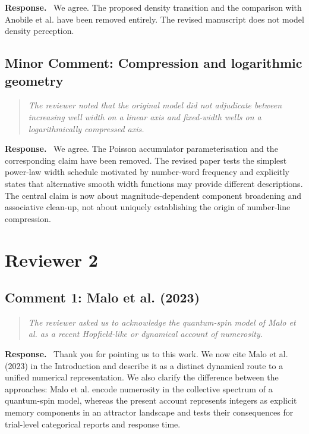 \documentclass[11pt]{article}
\newenvironment{reviewercomment}{\begin{quote}\color{reviewgray}\itshape}{\end{quote}}
\newenvironment{authorresponse}{\par\noindent\textbf{\color{responseblue}Response.}\ }{\par}
\begin{document}
\begin{authorresponse}
We agree. The proposed density transition and the comparison with Anobile et al. have been removed entirely. The revised manuscript does not model density perception.
\end{authorresponse}

\subsection*{Minor Comment: Compression and logarithmic geometry}

\begin{reviewercomment}
The reviewer noted that the original model did not adjudicate between increasing well width on a linear axis and fixed-width wells on a logarithmically compressed axis.
\end{reviewercomment}

\begin{authorresponse}
We agree. The Poisson accumulator parameterisation and the corresponding claim have been removed. The revised paper tests the simplest power-law width schedule motivated by number-word frequency and explicitly states that alternative smooth width functions may provide different descriptions. The central claim is now about magnitude-dependent component broadening and associative clean-up, not about uniquely establishing the origin of number-line compression.
\end{authorresponse}

\section*{Reviewer 2}

\subsection*{Comment 1: Malo et al. (2023)}

\begin{reviewercomment}
The reviewer asked us to acknowledge the quantum-spin model of Malo et al. as a recent Hopfield-like or dynamical account of numerosity.
\end{reviewercomment}

\begin{authorresponse}
Thank you for pointing us to this work. We now cite Malo et al. (2023) in the Introduction and describe it as a distinct dynamical route to a unified numerical representation. We also clarify the difference between the approaches: Malo et al. encode numerosity in the collective spectrum of a quantum-spin model, whereas the present account represents integers as explicit memory components in an attractor landscape and tests their consequences for trial-level categorical reports and response time.
\end{authorresponse}
\end{document}
